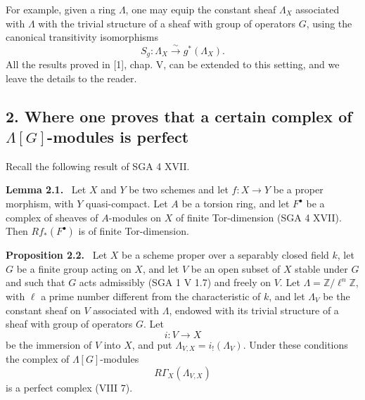 \documentclass[11pt]{article}
\newenvironment{statement}[1]{\par\medskip\noindent\textbf{#1.}\ }{\par\medskip}
\begin{document}
For example, given a ring $\Lambda$, one may equip the constant sheaf $\Lambda_X$ associated with $\Lambda$ with the trivial structure of a sheaf with group of operators $G$, using the canonical transitivity isomorphisms
\[
S_g:\Lambda_X\xrightarrow{\sim}g^*(\Lambda_X).
\]
All the results proved in [1], chap. V, can be extended to this setting, and we leave the details to the reader.

\subsection*{2. Where one proves that a certain complex of $\Lambda[G]$-modules is perfect}\label{sga5:X:subsection:2}

Recall the following result of SGA 4 XVII.

\label{sga5:X:lemma:2.1}\begin{statement}{Lemma 2.1}
Let $X$ and $Y$ be two schemes and let $f:X\to Y$ be a proper morphism, with $Y$ quasi-compact. Let $A$ be a torsion ring, and let $F^\bullet$ be a complex of sheaves of $A$-modules on $X$ of finite Tor-dimension (SGA 4 XVII). Then $Rf_*(F^\bullet)$ is of finite Tor-dimension.
\end{statement}

\label{sga5:X:proposition:2.2}\begin{statement}{Proposition 2.2}
Let $X$ be a scheme proper over a separably closed field $k$, let $G$ be a finite group acting on $X$, and let $V$ be an open subset of $X$ stable under $G$ and such that $G$ acts admissibly (SGA 1 V 1.7) and freely on $V$. Let $\Lambda=\mathbb Z/\ell^n\mathbb Z$, with $\ell$ a prime number different from the characteristic of $k$, and let $\Lambda_V$ be the constant sheaf on $V$ associated with $\Lambda$, endowed with its trivial structure of a sheaf with group of operators $G$. Let
\[
i:V\longrightarrow X
\]
be the immersion of $V$ into $X$, and put $\Lambda_{V,X}=i_!(\Lambda_V)$. Under these conditions the complex of $\Lambda[G]$-modules
\[
R\Gamma_X(\Lambda_{V,X})
\]
is a perfect complex (VIII 7).
\end{statement}
\end{document}
